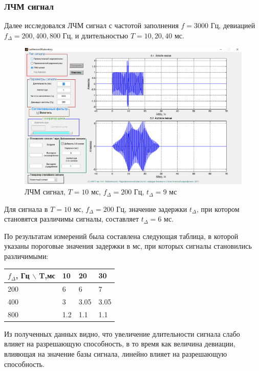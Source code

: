 \subsubsection{ЛЧМ сигнал}
Далее исследовался ЛЧМ сигнал с частотой заполнения $f=3000$ Гц, девиацией $f_\Delta = 200, 400, 800$ Гц, и
длительностью $T=10, 20, 40$ мс.
\begin{figure}[H]
    \centering
    \includegraphics[width=0.9\linewidth]{imgs/task5/lfm_dev200/t5s21_dur10_del9_dev200.png}
    \caption{ЛЧМ сигнал, $T=10$ мс, $f_\Delta=200$ Гц, $t_\Delta=9$ мс}
    \label{fig:t5s21_dur10_del9_dev200}
\end{figure}
Для сигнала в $T=10$ мс, $f_\Delta=200$ Гц, значение задержки $t_\Delta$, при котором становятся различимы сигналы,
составляет $t_\Delta=6$ мс.

По результатам измерений была составлена следующая таблица, в которой указаны пороговые значения задержки в мс, при
которых сигналы становились различимыми:
\begin{table}[H]
    \begin{tabular}{|l|l|l|l|}
    \hline
    $f_\Delta$, Гц $\backslash$ T,мс   & 10 & 20 & 30 \\ \hline
    200 &  6  &  6  &  7  \\ \hline
    400 &  3  &  3.05  &  3.05  \\ \hline
    800 &  1.2  &  1.1  &  1.1  \\
    \hline 
    \end{tabular}
\end{table}
Из полученных данных видно, что увеличение длительности сигнала слабо влияет на разрешающую способность, в то время как
величина девиации, влияющая на значение базы сигнала, линейно влияет на разрешающую способность.